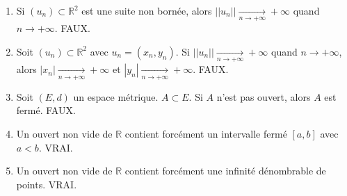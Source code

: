 \documentclass[oneside]{book}
\begin{document}
\begin{enumerate}
    \item Si $(u_n) \subset \mathbb{R}^2$ est une suite non bornée, alors $||u_n|| \xrightarrow[n \to +\infty]{} +\infty$ quand $n \to +\infty$. FAUX.

    \item Soit $(u_n) \subset \mathbb{R}^2$ avec $u_n = (x_n, y_n)$. Si $||u_n|| \xrightarrow[n \to +\infty]{} +\infty$ quand $n \to +\infty$, alors $|x_n| \xrightarrow[n \to +\infty]{} +\infty$ et $|y_n| \xrightarrow[n \to +\infty]{} +\infty$. FAUX.

    \item Soit $(E, d)$ un espace métrique. $A \subset E$. Si $A$ n'est pas ouvert, alors $A$ est fermé. FAUX.

    \item Un ouvert non vide de $\mathbb{R}$ contient forcément un intervalle fermé $[a, b]$ avec $a < b$. VRAI.

    \item Un ouvert non vide de $\mathbb{R}$ contient forcément une infinité dénombrable de points. VRAI.
\end{enumerate}
\end{document}

